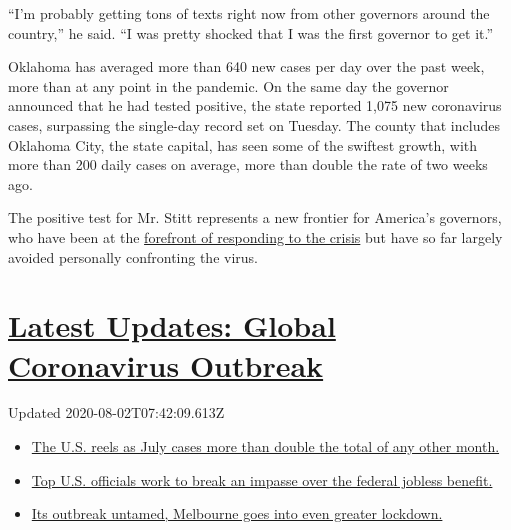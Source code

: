 ``I'm probably getting tons of texts right now from other governors
around the country,'' he said. ``I was pretty shocked that I was the
first governor to get it.''

Oklahoma has averaged more than 640 new cases per day over the past
week, more than at any point in the pandemic. On the same day the
governor announced that he had tested positive, the state reported 1,075
new coronavirus cases, surpassing the single-day record set on Tuesday.
The county that includes Oklahoma City, the state capital, has seen some
of the swiftest growth, with more than 200 daily cases on average, more
than double the rate of two weeks ago.

The positive test for Mr. Stitt represents a new frontier for America's
governors, who have been at the
\href{https://www.nytimes.com/2020/07/13/us/coronavirus-governors.html}{forefront
of responding to the crisis} but have so far largely avoided personally
confronting the virus.

\hypertarget{latest-updates-global-coronavirus-outbreak}{%
\section{\texorpdfstring{\href{https://www.nytimes.com/2020/08/01/world/coronavirus-covid-19.html?action=click\&pgtype=Article\&state=default\&region=MAIN_CONTENT_1\&context=storylines_live_updates}{Latest
Updates: Global Coronavirus
Outbreak}}{Latest Updates: Global Coronavirus Outbreak}}\label{latest-updates-global-coronavirus-outbreak}}

Updated 2020-08-02T07:42:09.613Z

\begin{itemize}
\tightlist
\item
  \href{https://www.nytimes.com/2020/08/01/world/coronavirus-covid-19.html?action=click\&pgtype=Article\&state=default\&region=MAIN_CONTENT_1\&context=storylines_live_updates\#link-34047410}{The
  U.S. reels as July cases more than double the total of any other
  month.}
\item
  \href{https://www.nytimes.com/2020/08/01/world/coronavirus-covid-19.html?action=click\&pgtype=Article\&state=default\&region=MAIN_CONTENT_1\&context=storylines_live_updates\#link-780ec966}{Top
  U.S. officials work to break an impasse over the federal jobless
  benefit.}
\item
  \href{https://www.nytimes.com/2020/08/01/world/coronavirus-covid-19.html?action=click\&pgtype=Article\&state=default\&region=MAIN_CONTENT_1\&context=storylines_live_updates\#link-2bc8948}{Its
  outbreak untamed, Melbourne goes into even greater lockdown.}
\end{itemize}


